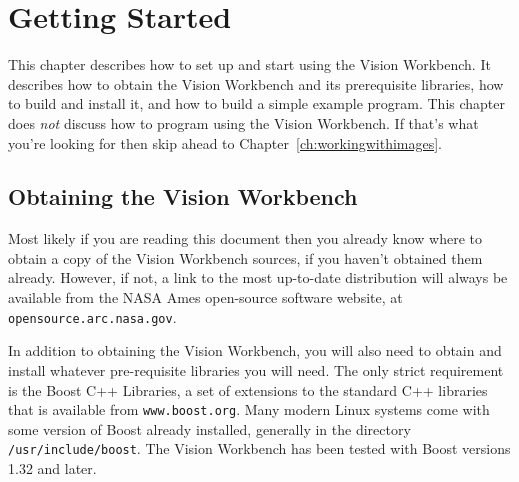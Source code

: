 \chapter{Getting Started}\label{ch:gettingstarted}

This chapter describes how to set up and start using the Vision
Workbench.  It describes how to obtain the Vision Workbench and its
prerequisite libraries, how to build and install it, and how to build
a simple example program.  This chapter does {\it not} discuss how to
program using the Vision Workbench.  If that's what you're looking for
then skip ahead to Chapter~\ref{ch:workingwithimages}.

\section{Obtaining the Vision Workbench}

Most likely if you are reading this document then you already know 
where to obtain a copy of the Vision Workbench sources, if you haven't 
obtained them already.  However, if not, a link to the most up-to-date 
distribution will always be available from the NASA Ames open-source 
software website, at \verb#opensource.arc.nasa.gov#.

In addition to obtaining the Vision Workbench, you will also need to
obtain and install whatever pre-requisite libraries you will need.
The only strict requirement is the Boost C++ Libraries, a set of
extensions to the standard C++ libraries that is available from
\verb#www.boost.org#.  Many modern Linux systems come with some
version of Boost already installed, generally in the directory
\verb#/usr/include/boost#.  The Vision Workbench has been tested with
Boost versions 1.32 and later.

